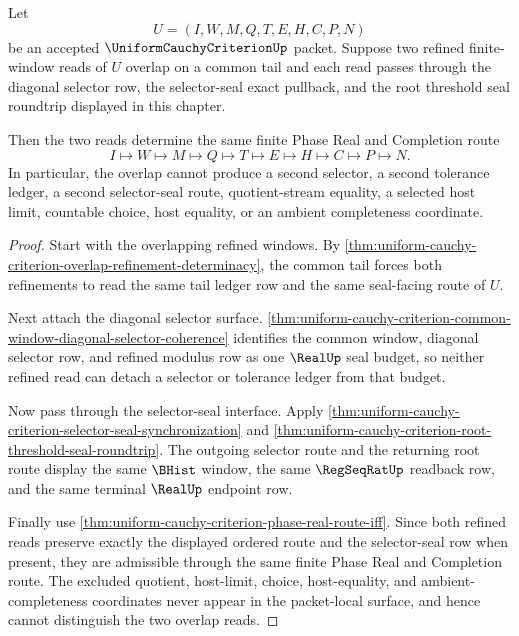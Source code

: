 \begin{theorem}
\label{thm:uniform-cauchy-criterion-overlap-roundtrip-confluence}
Let
$$
U=(I,W,M,Q,T,E,H,C,P,N)
$$
be an accepted $\UniformCauchyCriterionUp$ packet. Suppose two refined finite-window reads of $U$ overlap on a common tail and each read passes through the diagonal selector row, the selector-seal exact pullback, and the root threshold seal roundtrip displayed in this chapter.

Then the two reads determine the same finite Phase Real and Completion route
$$
I \longmapsto W \longmapsto M \longmapsto Q \longmapsto T \longmapsto E \longmapsto H \longmapsto C \longmapsto P \longmapsto N.
$$
In particular, the overlap cannot produce a second selector, a second tolerance ledger, a second selector-seal route, quotient-stream equality, a selected host limit, countable choice, host equality, or an ambient completeness coordinate.
\end{theorem}
\begin{proof}
Start with the overlapping refined windows. By \autoref{thm:uniform-cauchy-criterion-overlap-refinement-determinacy}, the common tail forces both refinements to read the same tail ledger row and the same seal-facing route of $U$.

Next attach the diagonal selector surface. \autoref{thm:uniform-cauchy-criterion-common-window-diagonal-selector-coherence} identifies the common window, diagonal selector row, and refined modulus row as one $\RealUp$ seal budget, so neither refined read can detach a selector or tolerance ledger from that budget.

Now pass through the selector-seal interface. Apply \autoref{thm:uniform-cauchy-criterion-selector-seal-synchronization} and \autoref{thm:uniform-cauchy-criterion-root-threshold-seal-roundtrip}. The outgoing selector route and the returning root route display the same $\BHist$ window, the same $\RegSeqRatUp$ readback row, and the same terminal $\RealUp$ endpoint row.

Finally use \autoref{thm:uniform-cauchy-criterion-phase-real-route-iff}. Since both refined reads preserve exactly the displayed ordered route and the selector-seal row when present, they are admissible through the same finite Phase Real and Completion route. The excluded quotient, host-limit, choice, host-equality, and ambient-completeness coordinates never appear in the packet-local surface, and hence cannot distinguish the two overlap reads.
\end{proof}

